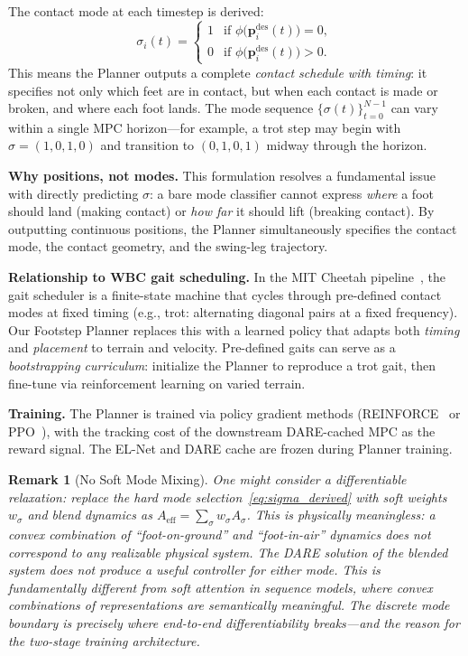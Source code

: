 \documentclass[letterpaper, 10pt, conference]{IEEEtran}
\newtheorem{remark}{Remark}
\newcommand{\bp}{\bm{p}}
\begin{document}
The contact mode at each timestep is derived:
\begin{equation}\label{eq:sigma_derived}
  \sigma_i(t) = \begin{cases}
    1 & \text{if } \phi\bigl(\bp_i^{\mathrm{des}}(t)\bigr) = 0, \\
    0 & \text{if } \phi\bigl(\bp_i^{\mathrm{des}}(t)\bigr) > 0.
  \end{cases}
\end{equation}
This means the Planner outputs a complete \emph{contact schedule
with timing}: it specifies not only which feet are in contact,
but when each contact is made or broken, and where each foot
lands.
The mode sequence $\{\sigma(t)\}_{t=0}^{N-1}$ can vary
within a single MPC horizon---for example, a trot step
may begin with $\sigma = (1,0,1,0)$ and transition to
$(0,1,0,1)$ midway through the horizon.

\textbf{Why positions, not modes.}
This formulation resolves a fundamental issue with directly
predicting $\sigma$: a bare mode classifier cannot express
\emph{where} a foot should land (making contact) or
\emph{how far} it should lift (breaking contact).
By outputting continuous positions, the Planner simultaneously
specifies the contact mode, the contact geometry, and the
swing-leg trajectory.

\textbf{Relationship to WBC gait scheduling.}
In the MIT Cheetah pipeline~\cite{kim2019}, the gait scheduler
is a finite-state machine that cycles through pre-defined
contact modes at fixed timing (e.g., trot: alternating
diagonal pairs at a fixed frequency).
Our Footstep Planner replaces this with a learned policy
that adapts both \emph{timing} and \emph{placement}
to terrain and velocity.
Pre-defined gaits can serve as a \emph{bootstrapping curriculum}:
initialize the Planner to reproduce a trot gait,
then fine-tune via reinforcement learning on varied terrain.

\textbf{Training.}
The Planner is trained via policy gradient methods
(REINFORCE~\cite{williams1992} or PPO~\cite{schulman2017}),
with the tracking cost of the downstream DARE-cached MPC
as the reward signal.
The EL-Net and DARE cache are frozen during Planner training.

\begin{remark}[No Soft Mode Mixing]\label{rem:mixing}
One might consider a differentiable relaxation: replace the
hard mode selection~\eqref{eq:sigma_derived} with soft weights
$w_\sigma$ and blend dynamics as
$A_{\mathrm{eff}} = \sum_\sigma w_\sigma A_\sigma$.
This is \emph{physically meaningless}: a convex combination
of ``foot-on-ground'' and ``foot-in-air'' dynamics
does not correspond to any realizable physical system.
The DARE solution of the blended system does not produce
a useful controller for either mode.
This is fundamentally different from soft attention in
sequence models, where convex combinations of
representations are semantically meaningful.
The discrete mode boundary is precisely where end-to-end
differentiability breaks---and the reason for the two-stage
training architecture.
\end{remark}
\end{document}
